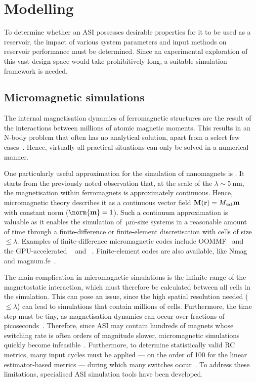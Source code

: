 \newpage
\section{Modelling}\label{sec:1:Modelling}
To determine whether an ASI possesses desirable properties for it to be used as a reservoir, the impact of various system parameters and input methods on reservoir performance must be determined.
Since an experimental exploration of this vast design space would take prohibitively long, a suitable simulation framework is needed.

\subsection{Micromagnetic simulations}
The internal magnetisation dynamics of ferromagnetic structures are the result of the interactions between millions of atomic magnetic moments.
This results in an N-body problem that often has no analytical solution, apart from a select few cases~\cite{PhD_Abert}.
Hence, virtually all practical situations can only be solved in a numerical manner. \par
One particularly useful approximation for the simulation of nanomagnets is .
It starts from the previously noted observation that, at the scale of the  $\lambda \sim \SI{5}{\nano\metre}$, the magnetisation within ferromagnets is approximately continuous.
Hence, micromagnetic theory describes it as a continuous vector field $\boldsymbol{\mathbf{M}}(\boldsymbol{\mathbf{r}}) = M_\mathrm{sat} \boldsymbol{\mathbf{m}}$ with constant norm ($\norm{\vc{m}} = 1$).
Such a continuum approximation is valuable as it enables the simulation of $\SI{}{\micro\metre}$-size systems in a reasonable amount of time through a finite-difference or finite-element discretisation with cells of size $\leq \lambda$.
Examples of finite-difference micromagnetic codes include OOMMF~\cite{OOMMF} and the GPU-accelerated \mumax~\cite{mumax3} and \mumaxplus~\cite{MOR-24}.
Finite-element codes are also available, like Nmag~\cite{Nmag} and magnum.fe~\cite{magnumFE}. \par %
The main complication in micromagnetic simulations is the infinite range of the magnetostatic interaction, which must therefore be calculated between all cells in the simulation.
This can pose an issue, since the high spatial resolution needed ($\leq \lambda$) can lead to simulations that contain millions of cells.
Furthermore, the time step must be tiny, as magnetisation dynamics can occur over fractions of picoseconds~\cite{PhD_Leliaert}.
Therefore, since ASI may contain hundreds of magnets whose switching rate is often orders of magnitude slower, micromagnetic simulations quickly become infeasible~\cite{leo2021chiral}.
Furthermore, to determine statistically valid RC metrics, many input cycles must be applied --- on the order of 100 for the linear estimator-based metrics --- during which many switches occur~\cite{RC_TaskAgnosticMetrics_v2}.
To address these limitations, specialised ASI simulation tools have been developed.

